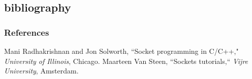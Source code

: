 \documentclass[12pt]{beamer}
\begin{document}

\subsection{bibliography}
\begin{frame}[allowframebreaks]
        \frametitle{References}
\begin{thebibliography}{100} %
 Mani Radhakrishnan and Jon Solworth, ``Socket programming in C/C++," \emph{University of Illinois}, Chicago.
 Maarteen Van Steen, ``Sockets tutorials,`` \emph{Vijre University}, Amsterdam.
\end{thebibliography}
\end{frame}
\end{document}
